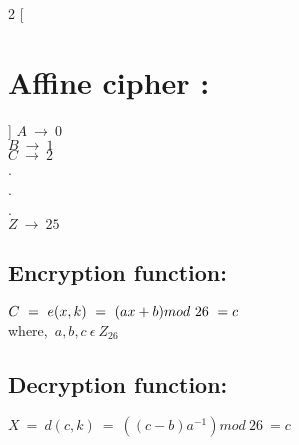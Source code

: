 \documentclass[11pt]{article}
\begin{document}
\begin{multicols}{2}
[\section{Affine cipher :}]
$A\ \rightarrow \ 0$ \\
$B\ \rightarrow \ 1$ \\
$C\ \rightarrow \ 2$ \\
.\\
.\\
.\\
$Z\ \rightarrow \ 25$ \\

\columnbreak
\subsection{Encryption function:}
$C\ =\ e(x,k)\ =\ (a \* x+b)mod\ 26\ =c$\\
where,\ $a,b,c\ \epsilon\ Z_{26}$

\subsection{Decryption function:}
$X\ =\ d(c,k)\ =\ ((c - b)a^{-1})mod\ 26\ =c$\\
\end{multicols}
\newpage
\end{document}
